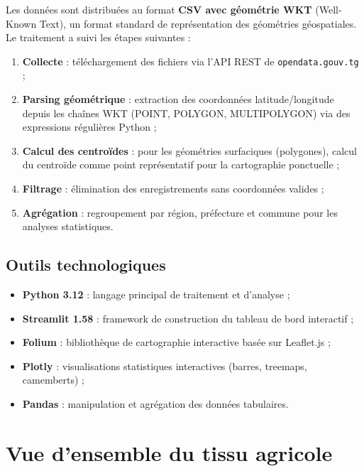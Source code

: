 \documentclass[12pt, a4paper]{article}
\begin{document}
Les données sont distribuées au format \textbf{CSV avec géométrie WKT} (Well-Known Text), un format
standard de représentation des géométries géospatiales. Le traitement a suivi les étapes suivantes :

\begin{enumerate}[leftmargin=1.5em]
    \item \textbf{Collecte} : téléchargement des fichiers via l'API REST de \texttt{opendata.gouv.tg} ;
    \item \textbf{Parsing géométrique} : extraction des coordonnées latitude/longitude depuis les chaînes WKT
          (POINT, POLYGON, MULTIPOLYGON) via des expressions régulières Python ;
    \item \textbf{Calcul des centroïdes} : pour les géométries surfaciques (polygones), calcul du centroïde
          comme point représentatif pour la cartographie ponctuelle ;
    \item \textbf{Filtrage} : élimination des enregistrements sans coordonnées valides ;
    \item \textbf{Agrégation} : regroupement par région, préfecture et commune pour les analyses statistiques.
\end{enumerate}

\subsection{Outils technologiques}

\begin{itemize}[leftmargin=1.5em]
    \item \textbf{Python 3.12} : langage principal de traitement et d'analyse ;
    \item \textbf{Streamlit 1.58} : framework de construction du tableau de bord interactif ;
    \item \textbf{Folium} : bibliothèque de cartographie interactive basée sur Leaflet.js ;
    \item \textbf{Plotly} : visualisations statistiques interactives (barres, treemaps, camemberts) ;
    \item \textbf{Pandas} : manipulation et agrégation des données tabulaires.
\end{itemize}

\section{Vue d'ensemble du tissu agricole}
\end{document}
